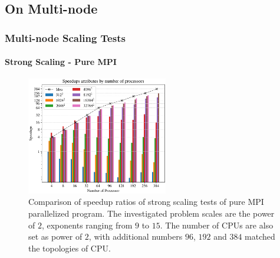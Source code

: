 








\subsection{On Multi-node}
\begin{frame}
  \frametitle{Multi-node Scaling Tests}
  \framesubtitle{Strong Scaling - Pure MPI}

  \begin{figure}[htbp]
    \centering
    \includegraphics[width=0.55\textwidth]{figure/FIG_Benchmark_pure_mpi_multi_nodes.pdf}
    \caption{
      Comparison of speedup ratios of strong scaling tests of pure MPI parallelized program. 
      The investigated problem scales are the power of $2$, exponents ranging from $9$ to $15$.
      The number of CPUs are also set as power of $2$, with additional numbers $96$, $192$ and $384$ matched the topologies of CPU.
    }
    \label{FIG:Benchmark:PURE_MPI_Multi_Node}
  \end{figure}
\end{frame}



